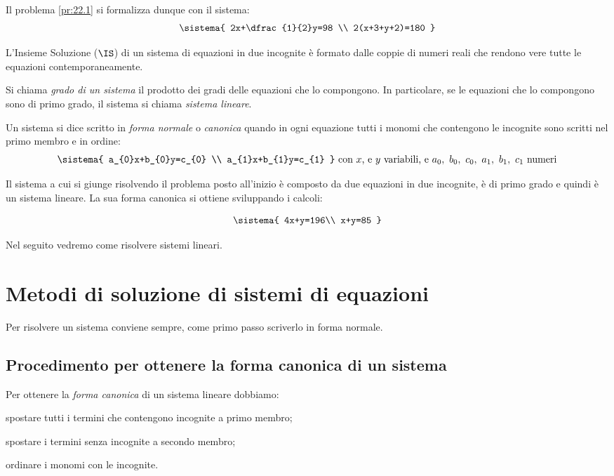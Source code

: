 Il problema \ref{pr:22.1} si formalizza dunque con il sistema:
\[\sistema{
 2x+\dfrac{1}{2}y=98 \\
 2(x+3+y+2)=180
}\]

\begin{definizione}{}{}
L'Insieme Soluzione (\(\IS\)) di un sistema di equazioni in
due incognite è formato dalle coppie di numeri reali
che rendono vere tutte le equazioni contemporaneamente.
\end{definizione}

\begin{definizione}{}{}
Si chiama \emph{grado di un sistema} il prodotto dei gradi delle
equazioni che lo compongono. 
In particolare, se le equazioni che lo compongono sono di primo grado, 
il sistema si chiama \emph{sistema lineare}.
\end{definizione}

\begin{definizione}{}{}
Un sistema si dice scritto in \emph{forma normale} o \emph{canonica} 
quando in ogni equazione tutti i monomi che contengono le incognite sono 
scritti nel primo membro e in ordine:
\[\sistema{
 a_{0}x+b_{0}y=c_{0} \\
 a_{1}x+b_{1}y=c_{1} 
}
\text{ con }x \text{, e } y \text{ variabili} \text{, e } 
a_{0},~b_{0},~c_{0},~a_{1},~b_{1},~c_{1}\text{ numeri}\]
\end{definizione}

Il sistema a cui si giunge risolvendo il problema posto all'inizio è
composto da due equazioni in due incognite, è di primo grado 
e quindi è un sistema lineare. 
La sua forma canonica si ottiene sviluppando i calcoli:

\[\sistema{
4x+y=196\\
x+y=85
}\]

Nel seguito vedremo come risolvere sistemi lineari.

\section{Metodi di soluzione di sistemi di equazioni}
\label{sec:sist_soluzione}

Per risolvere un sistema conviene sempre, come primo passo scriverlo in 
forma normale.

\subsection{Procedimento per ottenere la forma canonica di un sistema}
Per ottenere la \emph{forma canonica} di un sistema lineare dobbiamo:
\begin{enumerate*}
 \item spostare tutti i termini che contengono incognite a primo membro;
 \item spostare i termini senza incognite a secondo membro;
 \item ordinare i monomi con le incognite.
\end{enumerate*}

